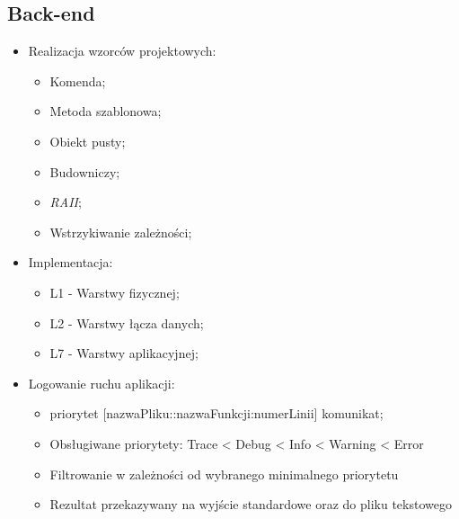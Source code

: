 
\subsection{Back-end}
\begin{itemize}
	\item Realizacja wzorców projektowych:
	\begin{itemize}
		\item Komenda;
		\item Metoda szablonowa;
		\item Obiekt pusty;
		\item Budowniczy;
		\item \textit{RAII};
		\item Wstrzykiwanie zależności;
	\end{itemize}
	\item Implementacja:
	\begin{itemize}
		\item L1 - Warstwy fizycznej;
		\item L2 - Warstwy łącza danych;
		\item L7 - Warstwy aplikacyjnej;
	\end{itemize}
	\item Logowanie ruchu aplikacji:
	\begin{itemize}
		\item <h:min::s::ms> priorytet [nazwaPliku::nazwaFunkcji:numerLinii] komunikat;
		\item Obsługiwane priorytety: Trace < Debug < Info <  Warning < Error
		\item Filtrowanie w zależności od wybranego minimalnego priorytetu
		\item Rezultat przekazywany na wyjście standardowe oraz do pliku tekstowego
	\end{itemize}
\end{itemize}


